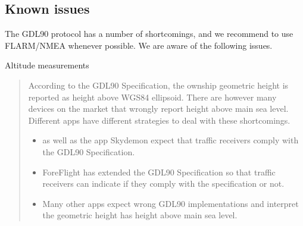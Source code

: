\documentclass[letterpaper,10pt,english]{sphinxmanual}
\begin{document}
\subsection{Known issues}
\label{\detokenize{04-appendix/technical:known-issues}}
\sphinxAtStartPar
The GDL90 protocol has a number of shortcomings, and we recommend to use
FLARM/NMEA whenever possible.  We are aware of the following issues.

\sphinxAtStartPar
Altitude measurements
\begin{quote}

\sphinxAtStartPar
According to the GDL90 Specification, the ownship geometric height is reported
as height above WGS\sphinxhyphen{}84 ellipsoid.  There are however many devices on the
market that wrongly report height above main sea level.  Different apps have
different strategies to deal with these shortcomings.
\begin{itemize}
\item {} 
\sphinxAtStartPar
{} as well as the app Skydemon expect that
traffic receivers comply with the GDL90 Specification.

\item {} 
\sphinxAtStartPar
ForeFlight has extended the GDL90 Specification so that traffic receivers
can indicate if they comply with the specification or not.

\item {} 
\sphinxAtStartPar
Many other apps expect wrong GDL90 implementations and interpret the
geometric height has height above main sea level.

\end{itemize}
\end{quote}
\end{document}

